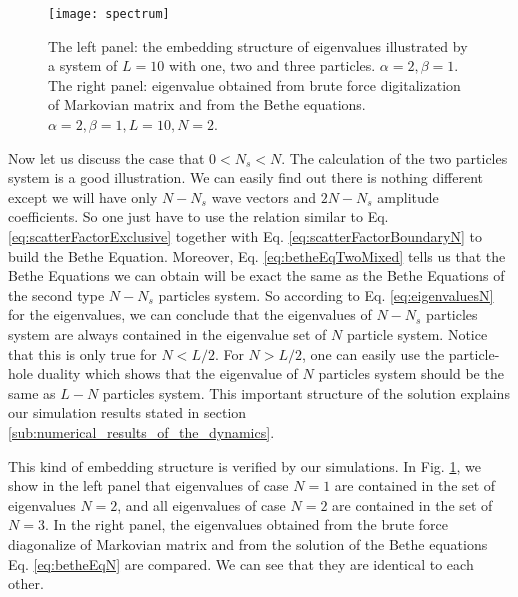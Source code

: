 \begin{figure}[htpb]
    \centering
    \texttt{[image: spectrum]}
    \caption{The left panel: the embedding structure of eigenvalues illustrated by a system of $L=10$ with one, two and three particles. $\alpha=2,\beta=1$. The right panel: eigenvalue obtained from brute force digitalization of Markovian matrix and from the Bethe equations. $\alpha=2,\beta=1,L=10,N=2$.}
    \label{fig:spectrum}
\end{figure}
Now let us discuss the case that $0<N_s<N$. The calculation of the two particles system is a good illustration. We can easily find out there is nothing different except we will have only $N-N_s$ wave vectors and $2N-N_s$ amplitude coefficients. So one just have to use the relation similar to Eq.  \eqref{eq:scatterFactorExclusive} together with Eq.  \eqref{eq:scatterFactorBoundaryN} to build the Bethe Equation. 
Moreover, Eq.  \eqref{eq:betheEqTwoMixed} tells us that the Bethe Equations we can obtain will be exact the same as the Bethe Equations of the second type $N-N_s$ particles system. So according to Eq. \eqref{eq:eigenvaluesN} for the eigenvalues, we can conclude that the eigenvalues of $N-N_s$ particles system are always contained in the eigenvalue set of $N$ particle system. 
Notice that this is only true for $N<L/2$. For $N>L/2$, one can easily use the particle-hole duality which shows that the eigenvalue of $N$ particles system should be the same as $L-N$ particles system.
This important structure of the solution explains our simulation results stated in section \ref{sub:numerical_results_of_the_dynamics}.

This kind of embedding structure is verified by our simulations.  In Fig. \ref{fig:spectrum}, we show in the left panel that eigenvalues of case $N=1$ are contained in the set of eigenvalues $N=2$, and all eigenvalues of case $N=2$ are contained in the set of $N=3$.  In the right panel, the eigenvalues obtained from the brute force diagonalize of Markovian matrix and from the solution of the Bethe equations Eq. \eqref{eq:betheEqN} are compared. We can see that they are identical to each other. 

